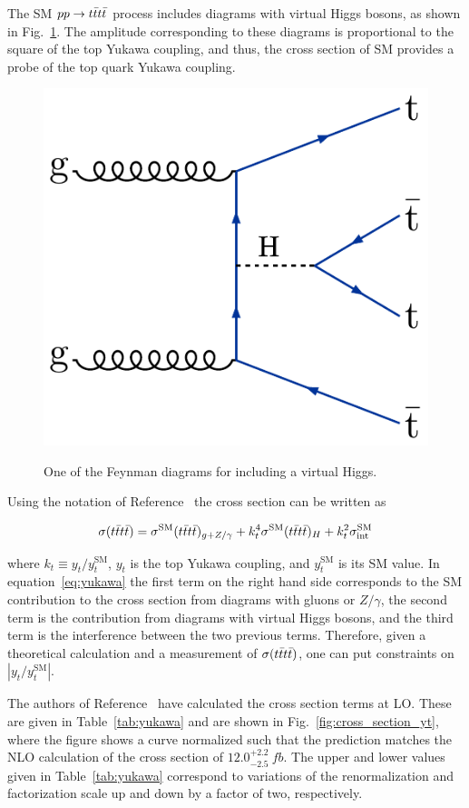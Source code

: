 The SM $pp \rightarrow t\bar{t}t\bar{t}$ process includes diagrams with virtual Higgs bosons,
as shown in Fig.~\ref{fig:feynYukawa}. 
The amplitude corresponding to these diagrams is 
proportional to the square of the top Yukawa coupling,
and thus, the cross section of SM \tttt provides
a probe of the top quark Yukawa coupling.

\begin{figure}[!hbtp]
\centering
\includegraphics[width=.35\textwidth]{figs/ftp/ftdiag3.pdf} \\
\caption{One of the Feynman diagrams for \tttt including a virtual Higgs.}
\label{fig:feynYukawa}
\end{figure}

Using the notation of Reference~\cite{THEORY:TopYukawaTTTT} the \tttt cross section can be written 
as 

\begin{equation} 
\label{eq:yukawa}
\sigma(t\bar{t}t\bar{t}) = \sigma^{\text{SM}}(t\bar{t}t\bar{t})_{g+Z/\gamma} + k_t^4 \sigma^{\text{SM}}(t\bar{t}t\bar{t})_H + k_t^2 \sigma^{\text{SM}}_{\rm int}
\end{equation} 

\noindent where $k_t \equiv y_t/y_t^{\text{SM}}$, $y_t$ is the top Yukawa coupling, and $y_t^{\text{SM}}$ is its SM value.
In equation~\ref{eq:yukawa} the first term on the right hand side corresponds to the 
SM contribution to the cross section from diagrams with gluons or $Z/\gamma$, the second term
is the contribution from diagrams with virtual Higgs bosons, and the third term is the interference between
the two previous terms. Therefore, given a theoretical calculation and a measurement of $\sigma(t\bar{t}t\bar{t})$, one can put 
constraints on $|y_t/y_t^{\text{SM}}|$.

The authors of Reference~\cite{THEORY:TopYukawaTTTT} have calculated the cross section terms at LO.
These are given in Table~\ref{tab:yukawa} and are shown in Fig.~\ref{fig:cross_section_yt},
where the figure shows a curve normalized such that the prediction matches the NLO calculation of 
the \tttt cross section of $12.0^{+2.2}_{-2.5}~\unit{fb}$.
The upper and lower values given in Table~\ref{tab:yukawa} correspond to variations
of the renormalization and factorization scale up and down by a factor of two, respectively.

